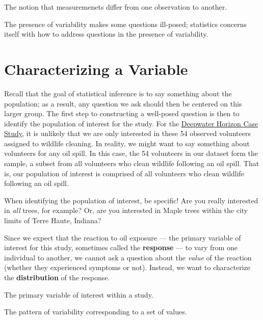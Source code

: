 \documentclass[]{book}
\theoremstyle{definition}
\theoremstyle{definition}
\theoremstyle{definition}
\theoremstyle{remark}
\let\BeginKnitrBlock\begin \let\EndKnitrBlock\end
\begin{document}
\BeginKnitrBlock{definition}[Variability]
\protect\hypertarget{def:defn-variability}{}{\label{def:defn-variability}
{} }The notion that measuremenets differ from
one observation to another.
\EndKnitrBlock{definition}

\BeginKnitrBlock{rmdkeyidea}
The presence of variability makes some questions ill-posed; statistics
concerns itself with how to address questions in the presence of
variability.
\EndKnitrBlock{rmdkeyidea}

\section{Characterizing a Variable}\label{characterizing-a-variable}

Recall that the goal of statistical inference is to say something about
the population; as a result, any question we ask should then be centered
on this larger group. The first step to constructing a well-posed
question is then to identify the population of interest for the study.
For the \protect\hyperlink{CaseDeepwater}{Deepwater Horizon Case Study},
it is unlikely that we are only interested in these 54 observed
volunteers assigned to wildlife cleaning. In reality, we might want to
say something about volunteers for any oil spill. In this case, the 54
volunteers in our dataset form the sample, a subset from all volunteers
who clean wildlife following an oil spill. That is, our population of
interest is comprised of all volunteers who clean wildlife following an
oil spill.

\BeginKnitrBlock{rmdtip}
When identifying the population of interest, be specific! Are you really
interested in \emph{all} trees, for example? Or, are you interested in
Maple trees within the city limits of Terre Haute, Indiana?
\EndKnitrBlock{rmdtip}

Since we expect that the reaction to oil exposure --- the primary
variable of interest for this study, sometimes called the
\textbf{response} --- to vary from one individual to another, we cannot
ask a question about the \emph{value} of the reaction (whether they
experienced symptoms or not). Instead, we want to characterize the
\textbf{distribution} of the response.

\BeginKnitrBlock{definition}[Response]
\protect\hypertarget{def:defn-response}{}{\label{def:defn-response}
{} }The primary variable of interest within a
study.
\EndKnitrBlock{definition}

\BeginKnitrBlock{definition}[Distribution]
\protect\hypertarget{def:defn-distribution}{}{\label{def:defn-distribution}
{} }The pattern of variability corresponding
to a set of values.
\EndKnitrBlock{definition}
\end{document}
